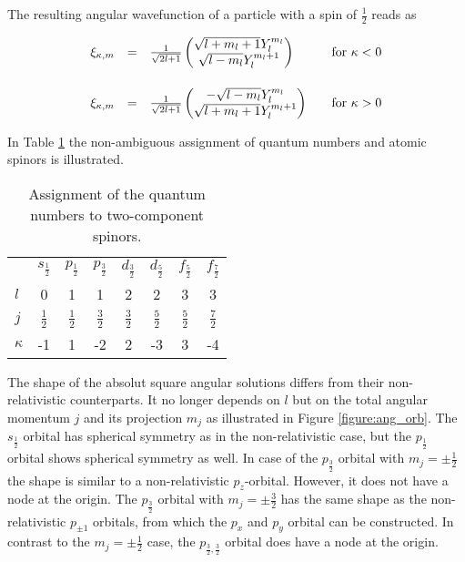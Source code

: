 The resulting angular wavefunction of a particle with a spin of $\frac12$ reads as

\begin{equation}\begin{array}{rcll}
\xi_{\kappa,m} &=& \frac1{\sqrt{2l+1}}\begin{pmatrix}\sqrt{l+m_l+1}Y_l^{m_l}\\\sqrt{l-m_l}Y_l^{m_l+1}\end{pmatrix} &\quad\text{for }\kappa<0\\\vphantom{\rule{0pt}{30pt}}
\xi_{\kappa,m} &=& \frac1{\sqrt{2l+1}}\begin{pmatrix}-\sqrt{l-m_l}Y_l^{m_l}\\\sqrt{l+m_l+1}Y_l^{m_l+1}\end{pmatrix} &\quad\text{for }\kappa>0\\
\end{array}\end{equation}

In Table \ref{qzspinor} the non-ambiguous assignment of quantum numbers and atomic
spinors is illustrated.

\begin{table}[h]
\centering
\begin{tabular}{lccccccc}
\toprule
        & $s_{\frac12}$ & $p_{\frac12}$ & $p_{\frac32}$ & $d_{\frac32}$ & $d_{\frac52}$ & $f_{\frac52}$ & $f_{\frac72}$\\\vphantom{\rule{0pt}{20pt}}
$l$     & 0            & 1           & 1            & 2            & 2            & 3            & 3\\\vphantom{\rule{0pt}{20pt}}
$j$     & $\frac12$    & $\frac12$   & $\frac32$    & $\frac32$    & $\frac52$    & $\frac52$    & $\frac72$\\\vphantom{\rule{0pt}{20pt}}
$\kappa$& -1           & 1           & -2           & 2            & -3           & 3            & -4\\
\bottomrule
\end{tabular}
\caption{Assignment of the quantum numbers to two-component spinors.\cite{dyallfaegri}}
\label{qzspinor}
\end{table}

The shape of the absolut square angular solutions differs from their
non-relativistic counterparts. It no longer depends on $l$ but on the total
angular momentum $j$ and its projection $m_j$ as illustrated in Figure
\ref{figure:ang_orb}. The $s_{\frac12}$ orbital has spherical symmetry as
in the non-relativistic case, but the $p_{\frac12}$ orbital shows spherical
symmetry as well. In case of the $p_{\frac32}$ orbital with $m_j=\pm \frac12$
the shape is similar to a non-relativistic $p_z$-orbital. However, it does not
have a node at the origin. The $p_{\frac32}$ orbital with $m_j=\pm \frac32$
has the same shape as the non-relativistic $p_{\pm 1}$ orbitals, from which
the $p_x$ and $p_y$ orbital can be constructed. In contrast to the
$m_j=\pm \frac12$ case, the $p_{\frac32,\frac32}$ orbital does have a node at
the origin.

